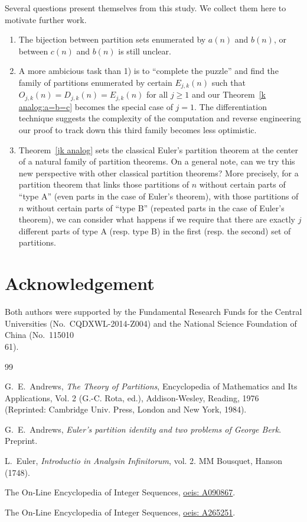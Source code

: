 \documentclass[12pt]{amsart}
\numberwithin{equation}{section}
\theoremstyle{plain}
\theoremstyle{definition}
\begin{document}
Several questions present themselves from this study. We collect them here to motivate further work.
\begin{enumerate}[1)]
\item The bijection between partition sets enumerated by $a(n)$ and $b(n)$, or between $c(n)$ and $b(n)$ is still unclear.
\item A more ambicious task than 1) is to ``complete the puzzle'' and find the family of partitions enumerated by certain $E_{j,k}(n)$ such that $O_{j,k}(n)=D_{j,k}(n)=E_{j,k}(n)$ for all $j\geq 1$ and our Theorem~\ref{k analog:a=b=c} becomes the special case of $j=1$. The differentiation technique suggests the complexity of the computation and reverse engineering our proof to track down this third family becomes less optimistic.
\item Theorem~\ref{jk analog} sets the classical Euler's partition theorem at the center of a natural family of partition theorems. On a general note, can we try this new perspective with other classical partition theorems? More precisely, for a partition theorem that links those partitions of $n$ without certain parts of ``type A'' (even parts in the case of Euler's theorem), with those partitions of $n$ without certain parts of ``type B'' (repeated parts in the case of Euler's theorem), we can consider what happens if we require that there are exactly $j$ different parts of type A (resp. type B) in the first (resp. the second) set of partitions.
\end{enumerate}




\section*{Acknowledgement}
Both authors were supported by the Fundamental Research Funds for the Central Universities (No.~CQDXWL-2014-Z004) and the National Science Foundation of China (No.~115010\\61).





\begin{thebibliography}{99}

G.~E.~Andrews, \emph{The Theory of Partitions}, Encyclopedia of Mathematics and Its Applications, Vol. 2 (G.-C. Rota, ed.), Addison-Wesley, Reading, 1976 (Reprinted: Cambridge Univ. Press, London and New York, 1984).

G.~E.~Andrews, \emph{Euler's partition identity and two problems of George Berk}. Preprint.

L.~Euler, \emph{Introductio in Analysin Infinitorum}, vol. 2. MM Bousquet, Hanson (1748).

The On-Line Encyclopedia of Integer Sequences, \href{http://oeis.org/A090867}{oeis: A090867}.

The On-Line Encyclopedia of Integer Sequences, \href{http://oeis.org/A265251}{oeis: A265251}.


\end{thebibliography}
\end{document}
